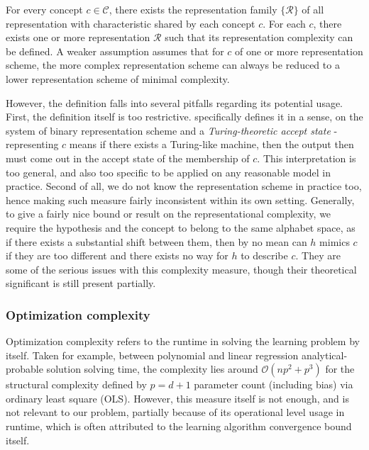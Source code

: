 \begin{assumption}
    For every concept $c\in\mathcal{C}$, there exists the representation family $\{\mathcal{R}\}$ of all representation with characteristic shared by each concept $c$. For each $c$, there exists one or more representation $\mathcal{R}$ such that its representation complexity can be defined. A weaker assumption assumes that for $c$ of one or more representation scheme, the more complex representation scheme can always be reduced to a lower representation scheme of minimal complexity.
\end{assumption}

However, the definition falls into several pitfalls regarding its potential usage. First, the definition itself is too restrictive. \cite{10.5555/200548} specifically defines it in a sense, on the system of binary representation scheme and a \textit{Turing-theoretic accept state} - representing $c$ means if there exists a Turing-like machine, then the output then must come out in the accept state of the membership of $c$. This interpretation is too general, and also too specific to be applied on any reasonable model in practice. Second of all, we do not know the representation scheme in practice too, hence making such measure fairly inconsistent within its own setting. Generally, to give a fairly nice bound or result on the representational complexity, we require the hypothesis and the concept to belong to the same alphabet space, as if there exists a substantial shift between them, then by no mean can $h$ mimics $c$ if they are too different and there exists no way for $h$ to describe $c$. They are some of the serious issues with this complexity measure, though their theoretical significant is still present partially. 

\subsubsection{Optimization complexity}

Optimization complexity refers to the runtime in solving the learning problem by itself. Taken for example, between polynomial and linear regression analytical-probable solution solving time, the complexity lies around $\mathcal{O}(np^{2}+p^{3})$ for the structural complexity defined by $p=d+1$ parameter count (including bias) via ordinary least square (OLS). However, this measure itself is not enough, and is not relevant to our problem, partially because of its operational level usage in runtime, which is often attributed to the learning algorithm convergence bound itself. 

